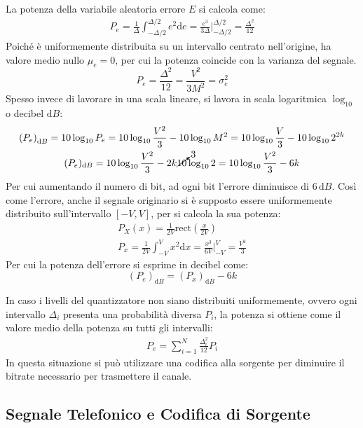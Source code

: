 \documentclass{article}
\newcommand{\rect}{\mathrm{rect}}
\newcommand{\df}{\mathrm{d}}
\numberwithin{equation}{subsection}
\begin{document}
La potenza della variabile aleatoria errore $E$ si calcola come:
\begin{gather*}
    {P}_e=\displaystyle\frac{1}{\Delta}\int_{-\Delta /2}^{\Delta/2}e^2\df e=\frac{e^3}{3\Delta}\Bigg|_{-\Delta /2}^{\Delta/2}=\frac{\Delta^2}{12}
\end{gather*}
Poiché è uniformemente distribuita su un intervallo centrato nell'origine, ha valore medio nullo $\mu_e=0$, per cui la potenza coincide con la 
varianza del segnale. 
\begin{equation}
    P_e=\displaystyle\frac{\Delta^2}{12}=\frac{V^2}{3M^2}=\sigma_e^2
\end{equation}
Spesso invece di lavorare in una scala lineare, si lavora in scala logaritmica $\log_{10}$ o decibel $\df B$:
\begin{gather*}
    \left(P_e\right)_{\df B}=10\log_{10}P_e=10\log_{10}\displaystyle\frac{V^2}{3}-10\log_{10}M^2=10\log_{10}\displaystyle\frac{V}{3}-10\log_{10}2^{2k}\\
    (P_e)_{\df B}=10\log_{10}\displaystyle\frac{V^2}{3}-2k\cancelto{3}{10}\log_{10}2=10\log_{10}\displaystyle\frac{V^2}{3}-6k
\end{gather*}
Per cui aumentando il numero di bit, ad ogni bit l'errore diminuisce di $6\,\df B$. Così come l'errore, anche il 
segnale originario si è supposto essere uniformemente distribuito sull'intervallo $[-V,V]$, per si calcola la sua potenza:
\begin{gather*}
    P_X(x)=\displaystyle\frac{1}{2V}\rect\left(\frac{x}{2V}\right)\\
    P_x=\displaystyle\frac{1}{2V}\int_{-V}^{V}x^2\df x=\frac{x^3}{6V}\Bigg|_{-V}^V=\frac{V^2}{3}
\end{gather*}
Per cui la potenza dell'errore si esprime in decibel come:
\begin{equation}
    (P_e)_{\df B}=(P_x)_{\df B}-6k
\end{equation}


In caso i livelli del quantizzatore non siano distribuiti uniformemente, ovvero ogni intervallo $\Delta_i$ presenta una probabilità diversa $P_i$, la potenza si ottiene 
come il valore medio della potenza su tutti gli intervalli:
\begin{gather*}
    P_e=\displaystyle\sum_{i=1}^N\frac{\Delta_i^2}{12}P_i
\end{gather*}
In questa situazione si può utilizzare una codifica alla sorgente per diminuire il bitrate necessario per trasmettere il canale. 

\subsection{Segnale Telefonico e Codifica di Sorgente}
\end{document}
